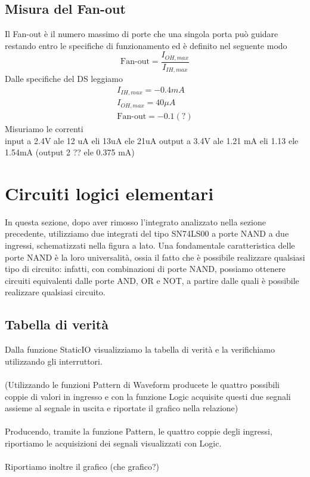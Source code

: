 \documentclass[10pt, a4paper, italian]{article}
\begin{document}
\subsection{Misura del Fan-out}
Il Fan-out è il numero massimo di porte che una singola porta può guidare restando entro le specifiche di funzionamento ed è definito nel seguente modo
\[
\mbox{Fan-out}=\frac{I_{OH,max}}{I_{IH,max}}
\]
Dalle specifiche del DS leggiamo
\begin{gather*}
    I_{IH,max}=-0.4 mA\\
    I_{OH,max}= 40 \mu A\\
    \mbox{Fan-out}=-0.1 (?) %
\end{gather*}
Misuriamo le correnti\\ %
input a 2.4V ale 12 uA eli  13uA ele 21uA
output a 3.4V ale 1.21 mA eli 1.13 ele 1.54mA
(output 2 ?? ele 0.375 mA)
\section{Circuiti logici elementari}
\begin{minipage}{0.65\textwidth}
    In questa sezione, dopo aver rimosso l'integrato analizzato nella sezione precedente, utilizziamo due integrati del tipo SN74LS00 a porte NAND a due ingressi, schematizzati nella figura a lato. Una fondamentale caratteristica delle porte NAND è la loro universalità, ossia il fatto che è possibile realizzare qualsiasi tipo di circuito: infatti, con combinazioni di porte NAND, possiamo ottenere circuiti equivalenti dalle porte AND, OR e NOT, a partire dalle quali è possibile realizzare qualsiasi circuito.
\end{minipage}
\begin{minipage}{0.35\textwidth}
    \label{NAND}
\end{minipage}

\subsection{Tabella di verità}
Dalla funzione StaticIO visualizziamo la tabella di verità e la verifichiamo utilizzando gli interruttori.\\
\\
(Utilizzando le funzioni Pattern di Waveform producete le quattro possibili coppie di valori in ingresso e con la funzione Logic acquisite questi due segnali assieme al segnale in uscita e riportate il grafico nella relazione)\\
\\
Producendo, tramite la funzione Pattern, le quattro coppie degli ingressi, riportiamo le acquisizioni dei segnali visualizzati con Logic.\\
\\
Riportiamo inoltre il grafico (che grafico?)
\end{document}
